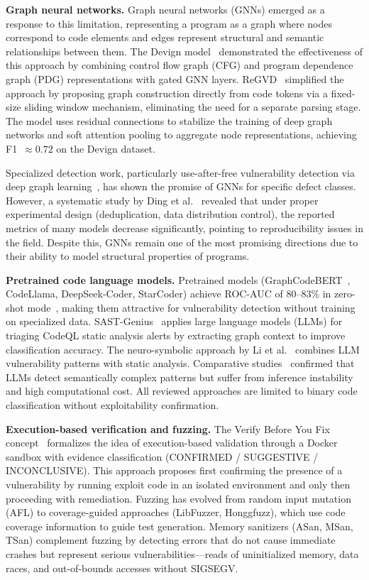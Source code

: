 \documentclass[runningheads]{llncs}
\begin{document}
\textbf{Graph neural networks.}
Graph neural networks (GNNs) emerged as a response to this limitation, representing a program as a graph where nodes correspond to code elements and edges represent structural and semantic relationships between them. The Devign model~\cite{zhou2019devign} demonstrated the effectiveness of this approach by combining control flow graph (CFG) and program dependence graph (PDG) representations with gated GNN layers. ReGVD~\cite{nguyen2022regvd} simplified the approach by proposing graph construction directly from code tokens via a fixed-size sliding window mechanism, eliminating the need for a separate parsing stage. The model uses residual connections to stabilize the training of deep graph networks and soft attention pooling to aggregate node representations, achieving F1~$\approx 0.72$ on the Devign dataset.

Specialized detection work, particularly use-after-free vulnerability detection via deep graph learning~\cite{chen2024uaf}, has shown the promise of GNNs for specific defect classes. However, a systematic study by Ding et al.~\cite{ding2024} revealed that under proper experimental design (deduplication, data distribution control), the reported metrics of many models decrease significantly, pointing to reproducibility issues in the field. Despite this, GNNs remain one of the most promising directions due to their ability to model structural properties of programs.

\textbf{Pretrained code language models.}
Pretrained models (GraphCodeBERT~\cite{guo2021graphcodebert}, CodeLlama, DeepSeek-Coder, StarCoder) achieve ROC-AUC of 80--83\% in zero-shot mode~\cite{ding2024}, making them attractive for vulnerability detection without training on specialized data. SAST-Genius~\cite{agrawal2025sast} applies large language models (LLMs) for triaging CodeQL static analysis alerts by extracting graph context to improve classification accuracy. The neuro-symbolic approach by Li et al.~\cite{li2025neurosymbolic} combines LLM vulnerability patterns with static analysis. Comparative studies~\cite{sultana2024,makhyari2024} confirmed that LLMs detect semantically complex patterns but suffer from inference instability and high computational cost. All reviewed approaches are limited to binary code classification without exploitability confirmation.

\textbf{Execution-based verification and fuzzing.}
The Verify Before You Fix concept~\cite{gajjar2026vbf} formalizes the idea of execution-based validation through a Docker sandbox with evidence classification (CONFIRMED / SUGGESTIVE / INCONCLUSIVE). This approach proposes first confirming the presence of a vulnerability by running exploit code in an isolated environment and only then proceeding with remediation. Fuzzing has evolved from random input mutation (AFL) to coverage-guided approaches (LibFuzzer, Honggfuzz), which use code coverage information to guide test generation. Memory sanitizers (ASan, MSan, TSan) complement fuzzing by detecting errors that do not cause immediate crashes but represent serious vulnerabilities---reads of uninitialized memory, data races, and out-of-bounds accesses without SIGSEGV.
\end{document}
